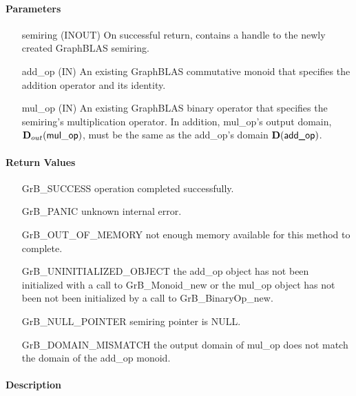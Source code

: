 \paragraph{Parameters}

\begin{itemize}[leftmargin=1.1in]
    \item[{\sf semiring}] ({\sf INOUT}) On successful return, contains a 
    handle to the newly created GraphBLAS semiring.
    \item[{\sf add\_op}]  ({\sf IN}) An existing GraphBLAS commutative monoid that 
    specifies the addition operator and its identity.
    \item[{\sf mul\_op}]  ({\sf IN}) An existing GraphBLAS binary operator that 
    specifies the semiring's multiplication operator. In addition, {\sf mul\_op}'s
    output domain, $\mbox{$\mathbf{D}_{out}$}({\sf mul\_op})$, must be the same as the {\sf add\_op}'s
    domain $\mathbf{D}(\mbox{\sf add\_op})$.
\end{itemize}


\paragraph{Return Values}

\begin{itemize}[leftmargin=2.1in]
\item[{\sf GrB\_SUCCESS}]           operation completed successfully.
\item[{\sf GrB\_PANIC}]             unknown internal error.
\item[{\sf GrB\_OUT\_OF\_MEMORY}]   not enough memory available for this method to complete.
\item[{\sf GrB\_UNINITIALIZED\_OBJECT}]   the {\sf add\_op} object has not been
                                    initialized with a call to {\sf GrB\_Monoid\_new}
                                    or the {\sf mul\_op} object has not been
                                    not been initialized by a call to 
                                    {\sf GrB\_BinaryOp\_new}.
\item[{\sf GrB\_NULL\_POINTER}]    {\sf semiring} pointer is {\sf NULL}.
\item[{\sf GrB\_DOMAIN\_MISMATCH}]  the output domain of {\sf mul\_op} does not
                                    match the domain of the {\sf add\_op} monoid.
\end{itemize}

\paragraph{Description}

